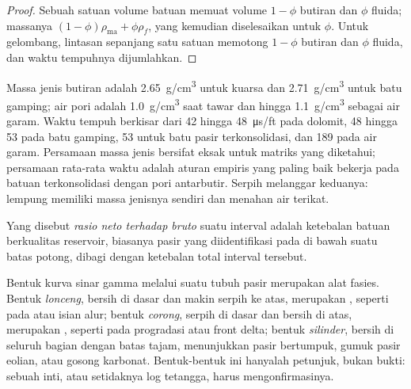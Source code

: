 \begin{proof}
Sebuah satuan volume batuan memuat volume $1 - \phi$ butiran dan $\phi$
fluida; massanya $(1 - \phi)\rho_{\mathrm{ma}} + \phi\rho_f$, yang kemudian diselesaikan
untuk $\phi$. Untuk gelombang, lintasan sepanjang satu satuan memotong $1 - \phi$ butiran
dan $\phi$ fluida, dan waktu tempuhnya dijumlahkan.
\end{proof}

Massa jenis butiran adalah \qty{2.65}{g/cm^3} untuk kuarsa dan \qty{2.71}{g/cm^3} untuk batu gamping;
air pori adalah \qty{1.0}{g/cm^3} saat tawar dan hingga
\qty{1.1}{g/cm^3} sebagai air garam. Waktu tempuh berkisar dari 42 hingga
\qty{48}{\micro\second/ft} pada dolomit, 48 hingga 53 pada batu gamping, 53 untuk batu pasir
terkonsolidasi, dan 189 pada air garam. Persamaan massa jenis bersifat eksak untuk
matriks yang diketahui; persamaan rata-rata waktu adalah aturan empiris yang paling baik
bekerja pada batuan terkonsolidasi dengan pori antarbutir. Serpih melanggar keduanya:
lempung memiliki massa jenisnya sendiri dan menahan air terikat.

\begin{definition}\label{def:b3:facies-models:ntg}
Yang disebut \emph{rasio neto terhadap bruto} suatu interval adalah
ketebalan batuan berkualitas reservoir, biasanya pasir yang diidentifikasi pada 
di bawah suatu batas potong, dibagi dengan ketebalan total interval tersebut.
\end{definition}

Bentuk kurva sinar gamma melalui suatu tubuh pasir merupakan alat fasies.
Bentuk \emph{lonceng}, bersih di dasar dan makin serpih ke atas, merupakan
, seperti pada  atau isian alur; bentuk \emph{corong}, serpih di
dasar dan bersih di atas, merupakan , seperti pada
 progradasi atau front delta; bentuk \emph{silinder}, bersih di seluruh bagian dengan
batas tajam, menunjukkan pasir  bertumpuk, gumuk pasir eolian, atau
gosong karbonat. Bentuk-bentuk ini hanyalah petunjuk, bukan bukti: sebuah inti, atau setidaknya
log tetangga, harus mengonfirmasinya.

